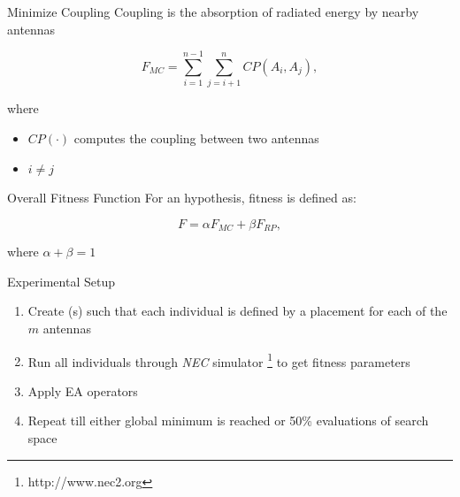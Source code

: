 \documentclass{beamer}
\begin{document}
                \begin{frame}{Minimize Coupling}
                    Coupling is the absorption of radiated energy by nearby antennas
                    \begin{tcolorbox}[colback=green!5]
                        \begin{equation}
                            F_{MC} = \sum_{i=1}^{n-1}\sum_{j=i+1}^{n} CP(A_i, A_j),
                        \end{equation}
                    \end{tcolorbox}
                    where
                    \begin{itemize}
                        \item $CP(\cdot)$ computes the coupling between two antennas
                        \item $i \neq j$
                    \end{itemize}
                \end{frame}


                \begin{frame}{Overall Fitness Function}
                    For an hypothesis, fitness is defined as:
                    \begin{tcolorbox}[colback=green!5]
                        \begin{equation} \label{eq:optimal}
                            F = \alpha F_{MC} + \beta F_{RP},
                        \end{equation}
                    \end{tcolorbox}
                    where $\alpha + \beta = 1$
                \end{frame}


                \begin{frame}[t]{Experimental Setup}
                    \begin{enumerate}
                        \item Create (s) such that each individual is defined by a placement for each of the $m$ antennas
                        \item Run all individuals through \textit{NEC} simulator \footnote{http://www.nec2.org} to get fitness parameters 
                        \item Apply EA operators 
                        \item Repeat till either global minimum is reached or 50\% evaluations of search space 
                    \end{enumerate}
                    \vspace{10mm}
                \end{frame}
\end{document}
